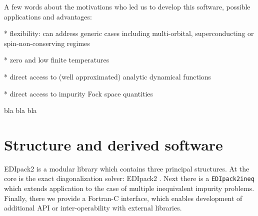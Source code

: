 \documentclass[final,3p,10pt]{elsarticle}
\def\NAME{{\rm EDIpack2 }}
\begin{document}
A few words about the motivations who led us to develop this
software, possible applications and advantages:


* flexibility: can address generic cases including multi-orbital,
superconducting or spin-non-conserving regimes

* zero and low finite temperatures

* direct access to (well approximated) analytic dynamical functions

* direct access to impurity Fock space quantities

bla bla bla










\section{Structure and derived software}\label{SecStruct}
\NAME is a modular library which contains three principal structures.
At the core is the exact diagonalization solver: \NAME.
Next there is a {\tt EDIpack2ineq} which extends application to the case of multiple
inequivalent impurity problems. Finally, there we provide a Fortran-C
interface, which enables development of additional API or
inter-operability with external libraries.  
\end{document}

